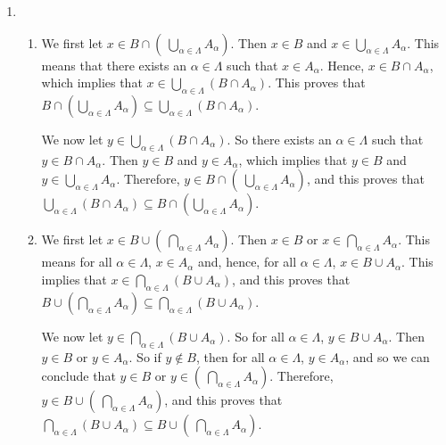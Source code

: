 \begin{enumerate}
\item \begin{enumerate}
\item We first let 
$x \in B \cap \left(\:\bigcup\limits_{\alpha \in \Lambda}^{}A_{\alpha} \right)$.  Then $x \in B$ and $x \in \bigcup\limits_{\alpha \in \Lambda}^{}A_{\alpha} $.  This means that there exists an $\alpha \in \Lambda$ such that $x \in A_\alpha$.  Hence, 
$x \in B \cap A_\alpha$, which implies that 
$x \in \bigcup\limits_{\alpha \in \Lambda}^{} \left( B \cap A_{\alpha} \right)$.  This proves that 
$B \cap \left(\bigcup\limits_{\alpha \in \Lambda}^{}A_{\alpha} \right) 
\subseteq \bigcup\limits_{\alpha \in \Lambda}^{} \left( B \cap A_{\alpha} \right)$.
 
We now let 
$y \in \bigcup\limits_{\alpha \in \Lambda}^{} \left( B \cap A_{\alpha} \right)$.  So there exists an $\alpha \in \Lambda$ such that $y \in B \cap A_{\alpha}$.  Then $y \in B$ and 
$y \in A_{\alpha}$, which implies that $y \in B$ and  
$y \in \bigcup\limits_{\alpha \in \Lambda}^{}A_{\alpha}$.  Therefore, 
$y \in B \cap \left(\:\bigcup\limits_{\alpha \in \Lambda}^{}A_{\alpha} \right)$, and this proves that 
$\bigcup\limits_{\alpha \in \Lambda}^{} \left( B \cap A_{\alpha} \right) \subseteq B \cap \left(\bigcup\limits_{\alpha \in \Lambda}^{}A_{\alpha} \right)$.

\item We first let 
$x \in B \cup \left(\:\bigcap\limits_{\alpha \in \Lambda}^{}A_{\alpha} \right)$.  Then $x \in B$ or $x \in \bigcap\limits_{\alpha \in \Lambda}^{}A_{\alpha} $.  This means for all 
 $\alpha \in \Lambda$, $x \in A_\alpha$ and, hence, for all $\alpha \in \Lambda$, 
$x \in B \cup A_\alpha$.  This implies that 
$x \in \bigcap\limits_{\alpha \in \Lambda}^{} \left( B \cup A_{\alpha} \right)$, and this proves that 
$B \cup \left(\bigcap\limits_{\alpha \in \Lambda}^{}A_{\alpha} \right) 
\subseteq \bigcap\limits_{\alpha \in \Lambda}^{} \left( B \cup A_{\alpha} \right)$.
 
We now let 
$y \in \bigcap\limits_{\alpha \in \Lambda}^{} \left( B \cup A_{\alpha} \right)$.  So for all $\alpha \in \Lambda$, $y \in B \cup A_{\alpha}$.  Then $y \in B$ or 
$y \in A_{\alpha}$.  So if $y \notin B$, then for all $\alpha \in \Lambda$, 
$y \in A_{\alpha}$, and so we can conclude that $y \in B$ or 
$y \in  \left(\:\bigcap\limits_{\alpha \in \Lambda}^{}A_{\alpha} \right)$.  Therefore, 
$y \in B \cup \left(\:\bigcap\limits_{\alpha \in \Lambda}^{}A_{\alpha} \right)$, and this proves that $\bigcap\limits_{\alpha \in \Lambda}^{} \left( B \cup A_{\alpha} \right) \subseteq B \cup \left(\:\bigcap\limits_{\alpha \in \Lambda}^{}A_{\alpha} \right)$.
\end{enumerate}




\end{enumerate}
